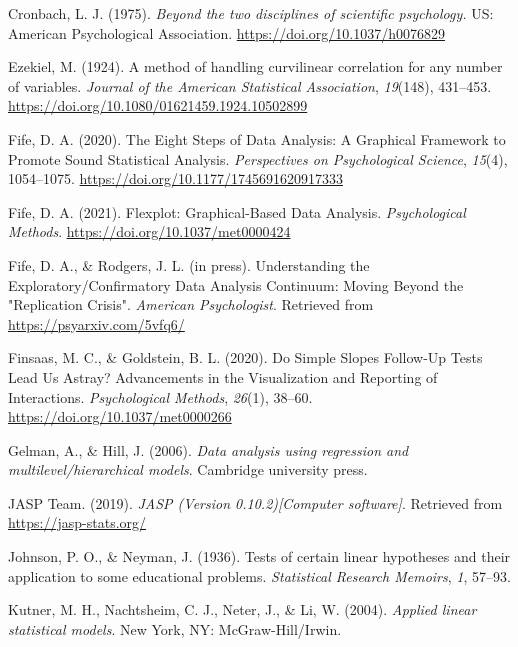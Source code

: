 \documentclass[
  man,floatsintext]{apa6}
\newlength{\cslhangindent}
\newenvironment{CSLReferences}[2] %
 {\begin{list}{}{%
  \setlength{\itemindent}{0pt}
  \setlength{\leftmargin}{0pt}
  \setlength{\parsep}{0pt}
  \ifodd #1
   \setlength{\leftmargin}{\cslhangindent}
   \setlength{\itemindent}{-1\cslhangindent}
  \fi
  \setlength{\itemsep}{#2\baselineskip}}}
 {\end{list}}
\begin{document}
\begin{CSLReferences}{1}{0}
Cronbach, L. J. (1975). \emph{{Beyond the two disciplines of scientific psychology.}} US: American Psychological Association. \url{https://doi.org/10.1037/h0076829}

Ezekiel, M. (1924). A method of handling curvilinear correlation for any number of variables. \emph{Journal of the American Statistical Association}, \emph{19}(148), 431--453. \url{https://doi.org/10.1080/01621459.1924.10502899}

Fife, D. A. (2020). {The Eight Steps of Data Analysis: A Graphical Framework to Promote Sound Statistical Analysis}. \emph{Perspectives on Psychological Science}, \emph{15}(4), 1054--1075. \url{https://doi.org/10.1177/1745691620917333}

Fife, D. A. (2021). {Flexplot: Graphical-Based Data Analysis}. \emph{Psychological Methods}. \url{https://doi.org/10.1037/met0000424}

Fife, D. A., \& Rodgers, J. L. (in press). {Understanding the Exploratory/Confirmatory Data Analysis Continuum: Moving Beyond the "Replication Crisis"}. \emph{American Psychologist}. Retrieved from \url{https://psyarxiv.com/5vfq6/}

Finsaas, M. C., \& Goldstein, B. L. (2020). {Do Simple Slopes Follow-Up Tests Lead Us Astray? Advancements in the Visualization and Reporting of Interactions}. \emph{Psychological Methods}, \emph{26}(1), 38--60. \url{https://doi.org/10.1037/met0000266}

Gelman, A., \& Hill, J. (2006). \emph{Data analysis using regression and multilevel/hierarchical models}. Cambridge university press.

JASP Team. (2019). \emph{{JASP (Version 0.10.2){[}Computer software{]}}}. Retrieved from \url{https://jasp-stats.org/}

Johnson, P. O., \& Neyman, J. (1936). {Tests of certain linear hypotheses and their application to some educational problems.} \emph{Statistical Research Memoirs}, \emph{1}, 57--93.

Kutner, M. H., Nachtsheim, C. J., Neter, J., \& Li, W. (2004). \emph{{Applied linear statistical models}}. New York, NY: McGraw-Hill/Irwin.


\end{CSLReferences}
\end{document}
